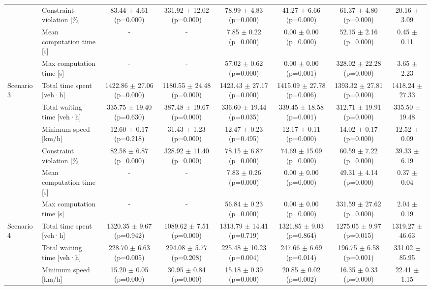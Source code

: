 \begin{table}[htbp]
{\begin{tabular}{llcccccc}
 & Constraint violation [\%] & 83.44 $\pm$ 4.61 (p=0.000) & 331.92 $\pm$ 12.02 (p=0.000) & 78.99 $\pm$ 4.83 (p=0.000) & 41.27 $\pm$ 6.66 (p=0.000) & 61.37 $\pm$ 4.80 (p=0.000) & 20.16 $\pm$ 3.09 \\
 & Mean computation time [s] & - & - & 7.85 $\pm$ 0.22 (p=0.000) & 0.00 $\pm$ 0.00 (p=0.000) & 52.15 $\pm$ 2.16 (p=0.000) & 0.45 $\pm$ 0.11 \\
 & Max computation time [s] & - & - & 57.02 $\pm$ 0.62 (p=0.000) & 0.00 $\pm$ 0.00 (p=0.001) & 328.02 $\pm$ 22.28 (p=0.000) & 3.65 $\pm$ 2.23 \\
\midrule
Scenario 3 & Total time spent [veh·h] & 1422.86 $\pm$ 27.06 (p=0.000) & 1180.55 $\pm$ 24.48 (p=0.000) & 1423.43 $\pm$ 27.17 (p=0.000) & 1415.09 $\pm$ 27.78 (p=0.006) & 1393.32 $\pm$ 27.81 (p=0.000) & 1418.24 $\pm$ 27.33 \\
 & Total waiting time [veh·h] & 335.75 $\pm$ 19.40 (p=0.630) & 387.48 $\pm$ 19.67 (p=0.000) & 336.60 $\pm$ 19.44 (p=0.035) & 339.45 $\pm$ 18.58 (p=0.001) & 312.71 $\pm$ 19.91 (p=0.000) & 335.50 $\pm$ 19.48 \\
 & Minimum speed [km/h] & 12.60 $\pm$ 0.17 (p=0.218) & 31.43 $\pm$ 1.23 (p=0.000) & 12.47 $\pm$ 0.23 (p=0.495) & 12.17 $\pm$ 0.11 (p=0.000) & 14.02 $\pm$ 0.17 (p=0.000) & 12.52 $\pm$ 0.09 \\
 & Constraint violation [\%] & 82.58 $\pm$ 6.87 (p=0.000) & 328.92 $\pm$ 11.40 (p=0.000) & 78.15 $\pm$ 6.87 (p=0.000) & 74.69 $\pm$ 15.09 (p=0.000) & 60.59 $\pm$ 7.22 (p=0.000) & 39.33 $\pm$ 6.19 \\
 & Mean computation time [s] & - & - & 7.83 $\pm$ 0.26 (p=0.000) & 0.00 $\pm$ 0.00 (p=0.000) & 49.31 $\pm$ 4.14 (p=0.000) & 0.37 $\pm$ 0.04 \\
 & Max computation time [s] & - & - & 56.84 $\pm$ 0.23 (p=0.000) & 0.00 $\pm$ 0.00 (p=0.000) & 331.59 $\pm$ 27.62 (p=0.000) & 2.04 $\pm$ 0.19 \\
\midrule
Scenario 4 & Total time spent [veh·h] & 1320.35 $\pm$ 9.67 (p=0.942) & 1089.62 $\pm$ 7.51 (p=0.000) & 1313.79 $\pm$ 14.41 (p=0.719) & 1321.85 $\pm$ 9.03 (p=0.864) & 1275.05 $\pm$ 9.97 (p=0.015) & 1319.27 $\pm$ 46.63 \\
 & Total waiting time [veh·h] & 228.70 $\pm$ 6.63 (p=0.005) & 294.08 $\pm$ 5.77 (p=0.208) & 225.48 $\pm$ 10.23 (p=0.004) & 247.66 $\pm$ 6.69 (p=0.014) & 196.75 $\pm$ 6.58 (p=0.001) & 331.02 $\pm$ 85.95 \\
 & Minimum speed [km/h] & 15.20 $\pm$ 0.05 (p=0.000) & 30.95 $\pm$ 0.84 (p=0.000) & 15.18 $\pm$ 0.39 (p=0.000) & 20.85 $\pm$ 0.02 (p=0.002) & 16.35 $\pm$ 0.33 (p=0.000) & 22.41 $\pm$ 1.15 \\

\end{tabular}}
\end{table}
